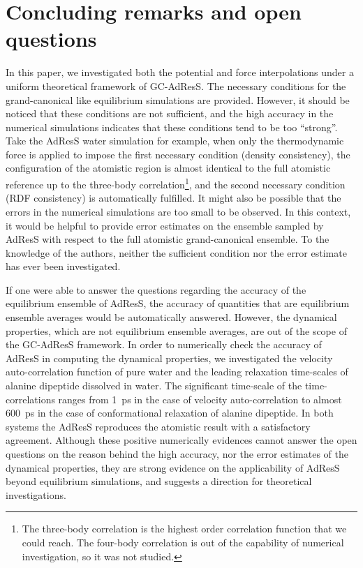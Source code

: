 \documentclass[epjST]{svjour}
\begin{document}
\section{Concluding remarks and open questions}
\label{sec:conclusion}

In this paper, we investigated both the potential and force
interpolations under a uniform theoretical framework of GC-AdResS. The
necessary conditions for the grand-canonical like equilibrium
simulations are provided. However, it should be noticed that these
conditions are not sufficient, and the high accuracy in the  numerical simulations indicates
that these conditions tend to be too ``strong''.  Take the AdResS
water simulation for example, when only the thermodynamic force is
applied to impose the first necessary condition (density consistency),
the configuration of the atomistic region is almost identical to the
full atomistic reference up to the three-body
correlation\footnote{
  The three-body correlation is the highest order correlation function that we could reach.
  The four-body correlation is out of the capability of numerical
investigation, so it was not studied.}, and the second necessary condition (RDF consistency)
is automatically fulfilled.
It might also be possible that the errors in the numerical simulations are too
small to be observed.  In this context, it would be helpful
to provide error estimates on the ensemble  sampled by AdResS with respect to the full atomistic
grand-canonical ensemble.
To the knowledge of the authors,
neither the sufficient condition nor the error estimate has ever been investigated.

If one were able to answer the questions regarding the accuracy of the equilibrium
ensemble of AdResS, the accuracy of quantities that are equilibrium ensemble
averages would be automatically answered. However, the dynamical properties, which are
not equilibrium ensemble averages, are out of the scope of the 
GC-AdResS framework. In order to numerically check the accuracy of AdResS
in computing the dynamical properties, we investigated the velocity auto-correlation
function of pure water and the leading relaxation time-scales of alanine dipeptide
dissolved in water.
The significant time-scale of the time-correlations ranges from 1~ps in the case of velocity auto-correlation
to almost 600~ps in the case of conformational relaxation of alanine dipeptide.
In both systems the AdResS reproduces the atomistic result
with a satisfactory agreement.
Although these positive numerically evidences cannot answer the open questions
on the reason behind the high accuracy, nor the error estimates of the dynamical properties,
they are strong evidence on the applicability of AdResS beyond equilibrium simulations,
and suggests a direction for theoretical investigations.
\end{document}
